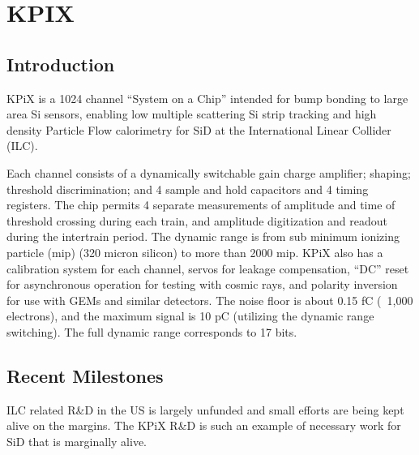 \section{KPIX}
\subsection{Introduction}
KPiX is a 1024 channel ``System on a Chip'' intended for bump bonding to large area Si sensors, enabling low multiple scattering Si strip tracking and high density Particle Flow calorimetry for SiD at the International Linear Collider (ILC).

Each channel consists of a dynamically switchable gain charge amplifier; shaping; threshold discrimination; and 4 sample and hold capacitors and 4 timing registers. The chip permits 4 separate measurements of amplitude and time of threshold crossing during each train, and amplitude digitization and readout during the intertrain period. The dynamic range is from sub minimum ionizing particle (mip) (320 micron silicon) to more than 2000 mip. KPiX also has a calibration system for each channel, servos for leakage compensation, ``DC'' reset for asynchronous operation for testing with cosmic rays, and polarity inversion for use with GEMs and similar detectors. The noise floor is about 0.15 fC (~1,000 electrons), and the maximum signal is 10 pC (utilizing the dynamic range switching). The full dynamic range corresponds to 17 bits. 

\subsection{Recent Milestones}
ILC related R\&D in the US is largely unfunded and small efforts are being kept alive on the margins. The KPiX R\&D is such an example of necessary work for SiD that is marginally alive.

